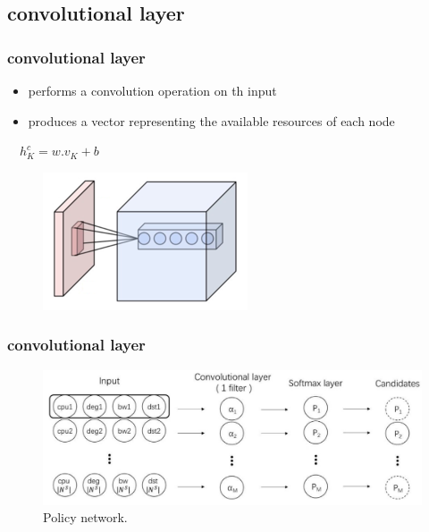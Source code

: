 \documentclass{beamer}
\begin{document}
\subsection{convolutional layer}
\begin{frame}
	\frametitle{convolutional layer}
	\begin{itemize}
		\item {performs a convolution operation on th input}
		\item {produces a vector representing the available
			resources of each node}
	\end{itemize}
    $\quad   h_K^c=w.v_K+b$
    
\begin{figure}
	\centering
	\includegraphics[width=0.3\linewidth]{../Images/Conv_layer}
	\label{fig:convlayer}
\end{figure}
\end{frame}

\begin{frame}
\frametitle{convolutional layer}
\begin{figure}
	\centering
	\includegraphics[width=0.9\linewidth]{../Images/policyNetwork}
	\caption{Policy network.}
	\label{fig:policynetwork}
\end{figure}
\end{frame}
\end{document}
